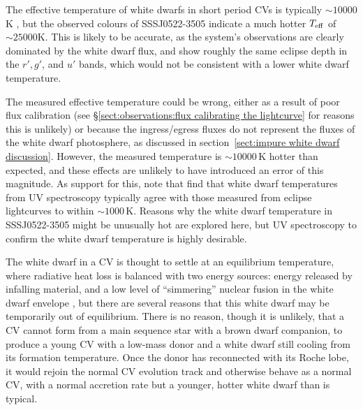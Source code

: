 The effective temperature of white dwarfs in short period CVs is typically $\sim10000$K \citep{Pala2017a}, but the observed colours of SSSJ0522-3505 indicate a much hotter $T_{\rm eff}$ of $\sim25000$K. This is likely to be accurate, as the system's observations are clearly dominated by the white dwarf flux, and show roughly the same eclipse depth in the $r', g'$, and $u'$ bands, which would not be consistent with a lower white dwarf temperature.

The measured effective temperature could be wrong, either as a result of poor flux calibration (see \S\ref{sect:observations:flux calibrating the lightcurve} for reasons this is unlikely) or because the ingress/egress fluxes do not represent the fluxes of the white dwarf photosphere, as discussed in section~\ref{sect:impure white dwarf discussion}. However, the measured temperature is  $\sim10000$\,K hotter than expected, and these effects are unlikely to have introduced an error of this magnitude. As support for this, note that \citet{Pala2017a} find that white dwarf temperatures from UV spectroscopy typically agree with those measured from eclipse lightcurves to within $\sim1000$\,K. Reasons why the white dwarf temperature in SSSJ0522-3505 might be unusually hot are explored here, but UV spectroscopy to confirm the white dwarf temperature is highly desirable.

The white dwarf in a CV is thought to settle at an equilibrium temperature, where radiative heat loss is balanced with two energy sources: energy released by infalling material, and a low level of ``simmering'' nuclear fusion in the white dwarf envelope \citep{Townsley2003, Townsley2004}, but there are several reasons that this white dwarf may be temporarily out of equilibrium.
There is no reason, though it is unlikely, that a CV cannot form from a main sequence star with a brown dwarf companion, to produce a young CV with a low-mass donor and a white dwarf still cooling from its formation temperature.
Once the donor has reconnected with its Roche lobe, it would rejoin the normal CV evolution track and otherwise behave as a normal CV, with a normal accretion rate but a younger, hotter white dwarf than is typical.

